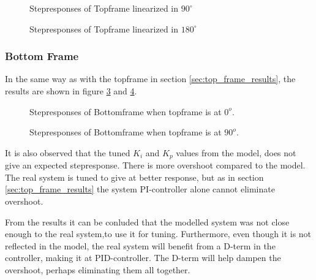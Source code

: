 \documentclass[../../Main]{subfiles}
\begin{document}
\begin{figure}[H]	
  \def\svgwidth{\textwidth}
  
  \caption{Stepresponses of Topframe linearized in $90^{\circ}$}
  \label{fig:top_90}
\end{figure}

\begin{figure}[H]
  \def\svgwidth{\textwidth}
  
  \caption{Stepresponses of Topframe linearized in $180^{\circ}$}
  \label{fig:top_180}
\end{figure}

\subsubsection{Bottom Frame}%
\label{sec:bottom_frame_results}

In the same way as with the topframe in section \ref{sec:top_frame_results}, the results are shown in figure \ref{fig:bot_0} and \ref{fig:bot_90}.

\begin{figure}[H]
  \def\svgwidth{\textwidth}
  
  \caption{Stepresponses of Bottomframe when topframe is at $0^o$.}
  \label{fig:bot_0}
\end{figure}

\begin{figure}[H]
 \def\svgwidth{\textwidth}
  
  \caption{Stepresponses of Bottomframe when topframe is at $90^o$.}
  \label{fig:bot_90}
\end{figure}

It is also observed that the tuned $K_i$ and $K_p$ values from the model, does not give an expected stepresponse. There is more overshoot compared to the model. The real system is tuned to give at better response, but as in section \ref{sec:top_frame_results} the system PI-controller alone cannot eliminate overshoot.

From the results it can be conluded that the modelled system was not close enough to the real system,to use it for tuning. Furthermore, even though it is not reflected in the model, the real system will benefit from a D-term in the controller, making it at PID-controller. The D-term will help dampen the overshoot, perhaps eliminating them all together. 
\end{document}
